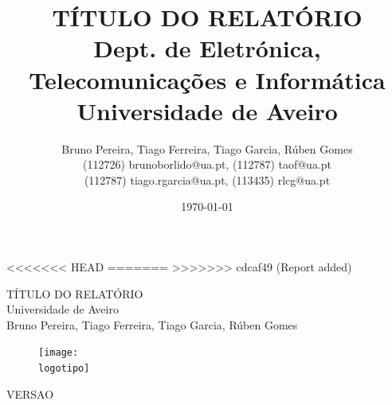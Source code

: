 \documentclass{report}
\begin{document}
%
\def\titulo{TÍTULO DO RELATÓRIO}
\def\data{DATA}
\def\autores{Bruno Pereira, Tiago Ferreira, Tiago Garcia, Rúben Gomes}
<<<<<<< HEAD
\def\autorescontactos{(112726) \href{mailto:brunoborlido@ua.pt}{brunoborlido@ua.pt}, (112787) \href{mailto:taof@ua.pt}{taof@ua.pt}\\(114184) \href{mailto:tiago.rgarcia@ua.pt}{tiago.rgarcia@ua.pt}, (113435) \href{mailto:rlcg@ua.pt}{rlcg@ua.pt}}
\def\versao{VERSAO 1}
=======
\def\autorescontactos{(112726) brunoborlido@ua.pt, (112787) taof@ua.pt
\\(112787) tiago.rgarcia@ua.pt, (113435) rlcg@ua.pt}
\def\versao{VERSAO}
>>>>>>> cdcaf49 (Report added)
\def\departamento{Dept. de Eletrónica, Telecomunicações e Informática}
\def\empresa{Universidade de Aveiro}
\def\logotipo{../images/ua.pdf}
%
%
\begin{titlepage}

\begin{center}
%
\vspace*{50mm}
%
{\Huge \titulo}\\ 
%
\vspace{10mm}
%
{\Large \empresa}\\
%
\vspace{10mm}
%
{\LARGE \autores}\\ 
%
\vspace{30mm}
%
\begin{figure}[h]
\center
\texttt{[image: \\logotipo]}
\end{figure}
%
\vspace{30mm}
\end{center}
%
\begin{flushright}
\versao
\end{flushright}
\end{titlepage}

\title{%
{\Huge\textbf{\titulo}}\\
{\Large \departamento\\ \empresa}
}
%
\author{%
    \autores \\
    \autorescontactos
}
%
\date{\today}
%
\maketitle

\end{document}
